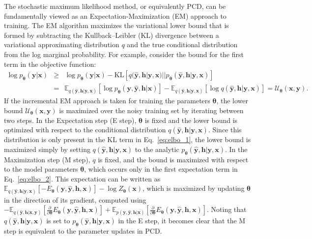 \documentclass{article}
\newcommand{\x}{{\pmb{x}}}
\newcommand{\y}{{\pmb{y}}}
\newcommand{\yh}{{\hat{\pmb{y}}}}
\newcommand{\h}{{\pmb{h}}}
\newcommand{\btheta}{{\pmb{\theta}}}
\def\KL{\text{KL}}
\begin{document}
The stochastic maximum likelihood method, or equivalently PCD, can be fundamentally viewed as an Expectation-Maximization (EM) approach to training. 
The EM algorithm maximizes the variational lower bound that is formed by subtracting the Kullback–Leibler (KL) divergence between
a variational approximating distribution $q$ and the true conditional distribution from the log marginal probability.
For example, consider the bound for the first term in the objective function:
\begin{eqnarray}
\log p_\btheta(\y|\x) &\geq& \log p_\btheta(\y|\x) - \KL[q(\yh, \h| \y, \x) || p_\btheta(\yh, \h| \y, \x)] \label{eq:elbo_1} \\
&=& \mathbb{E}_{q(\yh, \h| \y, \x)} [\log p_\btheta(\y, \yh, \h| \x)] - \mathbb{E}_{q(\yh, \h| \y, \x)} [\log q(\yh, \h| \y, \x)] = \mathcal{U}_\btheta(\x, \y). \label{eq:elbo_2}
\end{eqnarray}
If the incremental EM approach\cite{neal1998view} is taken for training the parameters $\btheta$, the lower bound $\mathcal{U}_\btheta(\x, \y)$
is maximized over the noisy training set by iterating between two steps. 
In the Expectation step (E step), $\btheta$ is fixed and the lower bound
is optimized with respect to the conditional distribution $q(\yh, \h| \y, \x)$. Since this distribution is only present in the KL term in Eq.~\ref{eq:elbo_1}, the lower bound
is maximized simply by setting $q(\yh, \h| \y, \x)$ to the analytic $p_\btheta(\yh, \h| \y, \x)$. 
In the Maximization step (M step), $q$ is fixed, and the bound is maximized 
with respect to the model parameters $\btheta$, which occurs only in the first expectation term in Eq.~\ref{eq:elbo_2}. This expectation can be written as
{\small $\mathbb{E}_{q(\yh, \h| \y, \x)} [-E_\btheta(\y, \yh, \h, \x)] - \log Z_{\btheta}(\x)$},
which is maximized by updating $\btheta$ in the direction of its gradient, computed using
{\small $- \mathbb{E}_{q(\yh, \h|\x,\y)} [\frac{\partial}{\partial \btheta} E_\btheta(\y, \yh, \h, \x)] 
+ \mathbb{E}_{p(\y, \yh, \h | \x)} [\frac{\partial}{\partial \btheta} E_\btheta(\y, \yh, \h, \x)]$}.
Noting that $q(\yh, \h| \y, \x)$ is set to $p_\btheta(\yh, \h| \y, \x)$ in the E step, it becomes clear that the M step is equivalent to the parameter updates in PCD.

\iffalse
Note that the second log probability term in Eq.~\ref{eq:elbo_1} is defined over
log conditional probability of $\yh$ and $\y$ marginalized over $\h$ and it can be optimized similar to the first term with slight difference that the posterior distribution
is defined over $\h$, i.e, $q(\h |\y, \yh, \x)$ will be set to $p_\btheta(\h| \y, \yh, \x) = p_\btheta(\h| \yh)$ in each E step.
\fi
\end{document}
